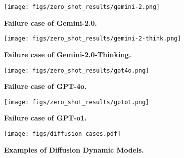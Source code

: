 \begin{figure}[htp]
    \centering
    \texttt{[image: figs/zero\_shot\_results/gemini-2.png]}
    \caption{\textbf{Failure case of Gemini-2.0.}}
    \label{fig:failure_gemini_2}
\end{figure}

\begin{figure}[htp]
    \centering
    \texttt{[image: figs/zero\_shot\_results/gemini-2-think.png]}
    \caption{\textbf{Failure case of Gemini-2.0-Thinking.}}
    \label{fig:failure_gemini_2_think}
\end{figure}

\begin{figure}[htp]
    \centering
    \texttt{[image: figs/zero\_shot\_results/gpt4o.png]}
    \caption{\textbf{Failure case of GPT-4o.}}
    \label{fig:failure_gpt4o}
\end{figure}

\begin{figure}[htp]
    \centering
    \texttt{[image: figs/zero\_shot\_results/gpto1.png]}
    \caption{\textbf{Failure case of GPT-o1.}}
    \label{fig:failure_gpto1}
\end{figure}


\begin{figure}[htp]
    \centering
    \texttt{[image: figs/diffusion\_cases.pdf]}
    \caption{\textbf{Examples of Diffusion Dynamic Models.}}
    \label{fig:diffusion_cases}
\end{figure}
